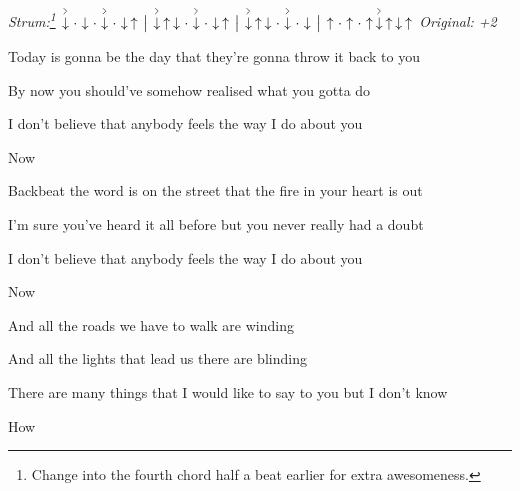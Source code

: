 \begin{song}


 \hfill
\textit{Strum:\footnote{Change into the fourth chord half a beat earlier for extra awesomeness.}}
$\AccentDown\Miss\Down\Miss\AccentDown\Miss\Down\Up \Separator
\AccentDown\Up\Down\Miss\AccentDown\Miss\Down\Up \Separator
\AccentDown\Up\Down\Miss\AccentDown\Miss\Down \Separator \Up 
\Miss\Up\Miss\Up\AccentDown\Up\Down\Up
$ \hfill
\textit{Original: +2}

\large


\large

\bigskip

      \par

\bigskip

 Today is gonna be the day that they're gonna throw it back to you \par
{} By now you should've somehow realised what you gotta do  \par
{}I don't believe that anybody feels the way I do about you \par
{}Now   \par

\bigskip

 Backbeat the word is on the street that the fire in your heart is out \par
{} I'm sure you've heard it all before but you never really had a doubt \par
{}I don't believe that anybody feels the way I do about you \par
{}Now    \par

\bigskip

And all the roads we have to walk are winding \par
And all the lights that lead us there are blinding \par
{}There are many things that I would like to say to you but I don't know \par
{}How \par


\end{song}
